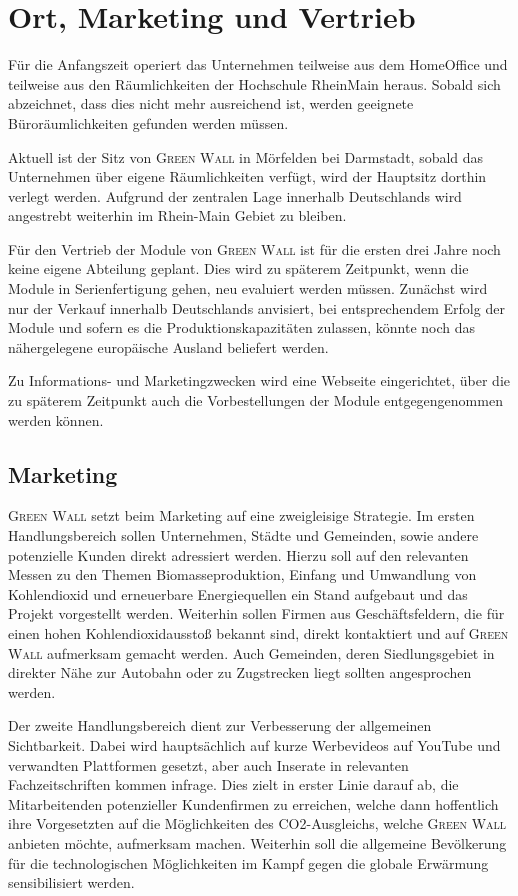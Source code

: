 \chapter{Ort, Marketing und Vertrieb}

Für die Anfangszeit operiert das Unternehmen teilweise aus dem HomeOffice und teilweise aus den Räumlichkeiten der Hochschule RheinMain heraus. 
Sobald sich abzeichnet, dass dies nicht mehr ausreichend ist, werden geeignete Büroräumlichkeiten gefunden werden müssen. 

Aktuell ist der Sitz von \textsc{Green Wall} in Mörfelden bei Darmstadt, sobald das Unternehmen über eigene Räumlichkeiten verfügt, wird der Hauptsitz dorthin verlegt werden. 
Aufgrund der zentralen Lage innerhalb Deutschlands wird angestrebt weiterhin im Rhein-Main Gebiet zu bleiben. 

Für den Vertrieb der Module von \textsc{Green Wall} ist für die ersten drei Jahre noch keine eigene Abteilung geplant. 
Dies wird zu späterem Zeitpunkt, wenn die Module in Serienfertigung gehen, neu evaluiert werden müssen. 
Zunächst wird nur der Verkauf innerhalb Deutschlands anvisiert, bei entsprechendem Erfolg der Module und sofern es die Produktionskapazitäten zulassen, könnte noch das nähergelegene europäische Ausland beliefert werden. 

Zu Informations- und Marketingzwecken wird eine Webseite eingerichtet, über die zu späterem Zeitpunkt auch die Vorbestellungen der Module entgegengenommen werden können. 

    \section{Marketing}

        \textsc{Green Wall} setzt beim Marketing auf eine zweigleisige Strategie.
        Im ersten Handlungsbereich sollen Unternehmen, Städte und Gemeinden, sowie andere potenzielle Kunden direkt adressiert werden.
        Hierzu soll auf den relevanten Messen zu den Themen Biomasseproduktion, Einfang und Umwandlung von Kohlendioxid und erneuerbare Energiequellen ein Stand aufgebaut und das Projekt vorgestellt werden.
        Weiterhin sollen Firmen aus Geschäftsfeldern, die für einen hohen Kohlendioxidausstoß bekannt sind, direkt kontaktiert und auf \textsc{Green Wall} aufmerksam gemacht werden.
        Auch Gemeinden, deren Siedlungsgebiet in direkter Nähe zur Autobahn oder zu Zugstrecken liegt sollten angesprochen werden.

        Der zweite Handlungsbereich dient zur Verbesserung der allgemeinen Sichtbarkeit.
        Dabei wird hauptsächlich auf kurze Werbevideos auf YouTube und verwandten Plattformen gesetzt, aber auch Inserate in relevanten Fachzeitschriften kommen infrage.
        Dies zielt in erster Linie darauf ab, die Mitarbeitenden potenzieller Kundenfirmen zu erreichen, welche dann hoffentlich ihre Vorgesetzten auf die Möglichkeiten des CO2-Ausgleichs, welche \textsc{Green Wall} anbieten möchte, aufmerksam machen.
        Weiterhin soll die allgemeine Bevölkerung für die technologischen Möglichkeiten im Kampf gegen die globale Erwärmung sensibilisiert werden.

